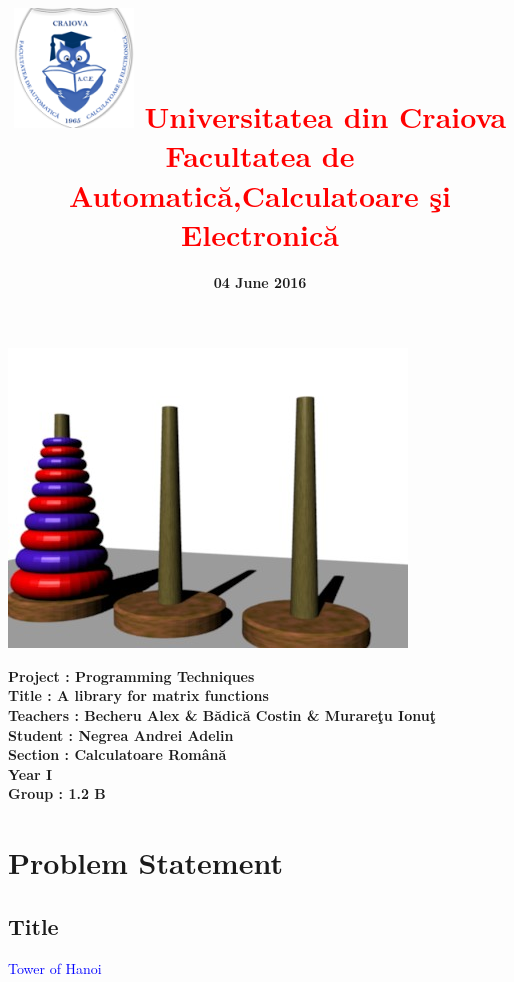 \documentclass[12]{article}
\begin{document}
\title{\textbf{\includegraphics[scale=0.5]{42.png}
\textcolor{red}{Universitatea din Craiova \\Facultatea de Automatic\u{a},Calculatoare \c{s}i Electronic\u{a}}}}
\date{\textbf{04 June 2016}}
\maketitle
\begin{center}
\includegraphics[scale=0.6]{towers-of-hanoi.jpg}
\end{center}
\textbf{Project : Programming Techniques} \\
\textbf{Title : A library for matrix functions}\\
\textbf{Teachers : Becheru Alex \& B\u{a}dic\u{a} Costin \& Murare\c{t}u Ionu\c{t} }\\
\textbf{Student : Negrea Andrei Adelin} \\
\textbf{Section : Calculatoare Rom\^{a}n\u{a}\\ Year I\\ Group : 1.2 B}
\newpage
\tableofcontents


\newpage
\section{Problem Statement}

\textcolor{white}{}
\subsection{Title}
         \textcolor{blue}    {Tower of Hanoi}
\end{document}
